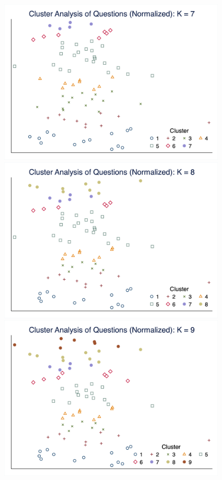 \documentclass[10pt,leqno]{article}
\begin{document}
\begin{figure}  [h!]
\begin{center}
\includegraphics[scale=0.15]{CA_QuestionK7_NOR.png}
\includegraphics[scale=0.15]{CA_QuestionK8_NOR.png}
\includegraphics[scale=0.15]{CA_QuestionK9_NOR.png}

\end{center}
\end{figure}
\end{document}
